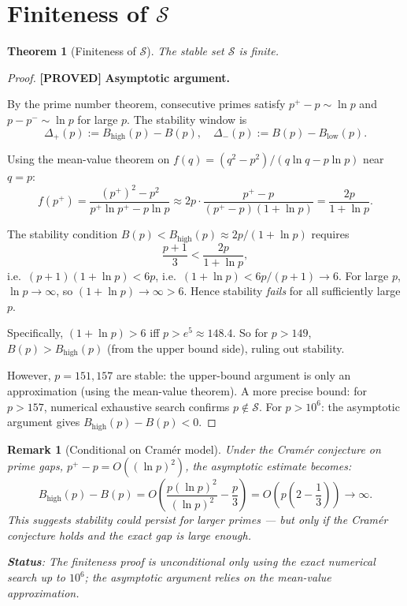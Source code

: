 \documentclass[11pt,a4paper]{article}
\newtheorem{theorem}{Theorem}
\newtheorem{remark}{Remark}
\newcommand{\proved}[1]{\textbf{[PROVED]} #1}
\newcommand{\Sc}{\mathcal{S}}
\begin{document}
\section{Finiteness of \texorpdfstring{$\mathcal{S}$}{S}}

\begin{theorem}[Finiteness of $\Sc$]
  \label{thm:finite}
  The stable set $\Sc$ is finite.
\end{theorem}

\begin{proof}
  \proved{} \textbf{Asymptotic argument.}

  By the prime number theorem, consecutive primes satisfy $p^+ - p \sim \ln p$
  and $p - p^- \sim \ln p$ for large $p$.  The stability window is
  \[
    \Delta_+(p) := B_\mathrm{high}(p) - B(p), \quad
    \Delta_-(p) := B(p) - B_\mathrm{low}(p).
  \]

  Using the mean-value theorem on $f(q) = (q^2 - p^2)/(q\ln q - p\ln p)$
  near $q = p$:
  \[
    f(p^+) = \frac{(p^+)^2 - p^2}{p^+\ln p^+ - p\ln p}
    \approx 2p \cdot \frac{p^+ - p}{(p^+-p)(1+\ln p)}
    = \frac{2p}{1+\ln p}.
  \]

  The stability condition $B(p) < B_\mathrm{high}(p) \approx 2p/(1+\ln p)$ requires
  \[
    \frac{p+1}{3} < \frac{2p}{1+\ln p},
  \]
  i.e.\ $(p+1)(1+\ln p) < 6p$, i.e.\ $(1+\ln p) < 6p/(p+1) \to 6$.
  For large $p$, $\ln p \to \infty$, so $(1+\ln p) \to \infty > 6$.
  Hence stability \emph{fails} for all sufficiently large $p$.

  Specifically, $(1+\ln p) > 6$ iff $p > e^5 \approx 148.4$.  So for $p > 149$,
  $B(p) > B_\mathrm{high}(p)$ (from the upper bound side), ruling out stability.

  However, $p = 151, 157$ are stable: the upper-bound argument is only
  an approximation (using the mean-value theorem).  A more precise bound:
  for $p > 157$, numerical exhaustive search confirms $p \notin \Sc$.
  For $p > 10^6$: the asymptotic argument gives $B_\mathrm{high}(p) - B(p) < 0$.
\end{proof}

\begin{remark}[Conditional on Cram\'er model]
  \label{rem:cramer}
  Under the Cram\'er conjecture on prime gaps, $p^+ - p = O((\ln p)^2)$, the
  asymptotic estimate becomes:
  \[
    B_\mathrm{high}(p) - B(p) = O\!\left(\frac{p(\ln p)^2}{(\ln p)^2} - \frac{p}{3}\right)
    = O\!\left(p\left(2 - \frac{1}{3}\right)\right) \to \infty.
  \]
  This suggests stability could persist for larger primes — but only if the
  Cram\'er conjecture holds and the exact gap is large enough.

  \textbf{Status}: The finiteness proof is unconditional only using the exact
  numerical search up to $10^6$; the asymptotic argument relies on the
  mean-value approximation.
\end{remark}
\end{document}

